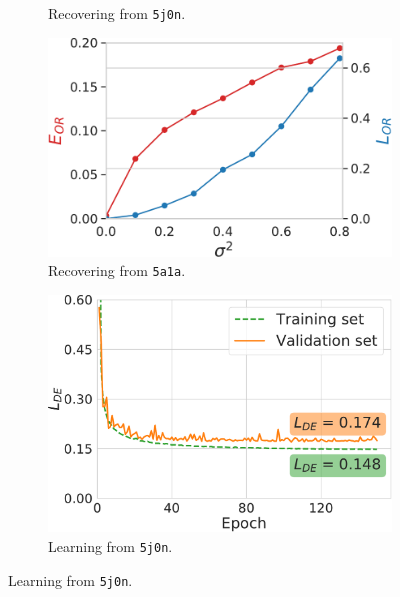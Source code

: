 \begin{figure}
\begin{minipage}[b]{0.48\linewidth}
\begin{subfigure}[b]{0.49\linewidth}
            \caption{Recovering from \texttt{5j0n}.}
        \end{subfigure}
        \hfill
        \begin{subfigure}[b]{0.49\linewidth}
        \centering
            \includegraphics[width=\linewidth]{figures/5a1a_perfect_noisy_ar_aa}
            \caption{Recovering from \texttt{5a1a}.}
        \end{subfigure}
        \caption{%
            Orientation recovery from perturbed distances.
        }\label{fig:perfect-with-noise-ar-aa}
    \end{minipage}
    \hfill
    \begin{minipage}[b]{0.45\linewidth}
        \begin{subfigure}[b]{0.47\linewidth}
            \centering
            \includegraphics[width=\linewidth]{figures/de_5j0n.pdf}
            \caption{Learning from \texttt{5j0n}.\vspace{0.5em}}

\end{subfigure}
\end{minipage}
\end{figure}
